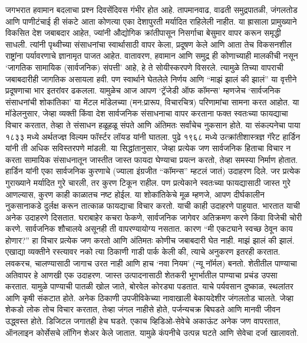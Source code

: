 जगभरात हवामान बदलाचा प्रश्न दिवसेंदिवस गंभीर होत आहे. तापमानवाढ, वाढती समुद्रपातळी, जंगलतोड आणि पाणीटंचाई ही संकटे आता कोणत्या एका देशापुरती मर्यादित राहिलेली नाहीत. या ह्रासाला प्रामुख्याने विकसित देश जबाबदार आहेत, ज्यांनी औद्योगिक क्रांतीपासून निसर्गाचा बेसुमार वापर करून समृद्धी साधली. त्यांनी पृथ्वीच्या संसाधनांचा स्वार्थासाठी वापर केला, प्रदूषण केले आणि आता तेच विकसनशील राष्ट्रांना पर्यावरणाचे ज्ञानामृत पाजत आहेत.
वातावरण, हवामान आणि समुद्र ही कोणाच्याही मालकीची नसून ‘जागतिक सामायिक (सार्वजनिक) संपत्ती’ आहे, हे ते सोयीस्करपणे विसरले. त्यामुळे तिच्या वापराची जबाबदारीही जागतिक असायला हवी. पण स्वार्थाने घेतलेले निर्णय आणि “माझं झालं की झालं” या वृत्तीने प्रदूषणाचा भार इतरांवर ढकलला. यामुळेच आज आपण ‘ट्रॅजेडी ऑफ कॉमन्स’ म्हणजेच ‘सार्वजनिक संसाधनांची शोकांतिका’ या मेंटल मॉडेलच्या (मन:प्रारूप, विचारचित्र) परिणामांचा सामना करत आहोत. या मॉडेलनुसार, जेव्हा व्यक्ती किंवा देश सार्वजनिक संसाधनाचा वापर करताना फक्त स्वतःच्या फायद्याचा विचार करतात, तेव्हा ते संसाधन हळूहळू संपते आणि अंतिमतः सर्वांचेच नुकसान होते.
या संकल्पनेचा पाया १८३३ मध्ये अर्थतज्ज्ञ विल्यम फॉर्स्टर लॉयड यांनी घातला. पुढे १९६८ मध्ये उत्क्रांतीशास्त्रज्ञ गॅरेट हार्डिन यांनी ती अधिक सविस्तरपणे मांडली. या सिद्धांतानुसार, जेव्हा प्रत्येक जण सार्वजनिक हिताचा विचार न करता सामायिक संसाधनातून जास्तीत जास्त फायदा घेण्याचा प्रयत्न करतो, तेव्हा समस्या निर्माण होतात. हार्डिन यांनी एका सार्वजनिक कुरणाचे (ज्याला इंग्रजीत “कॉमन्स” म्हटलं जातं) उदाहरण दिले. जर प्रत्येक गुराख्याने मर्यादित गुरे चारली, तर कुरण टिकून राहील. पण प्रत्येकाने स्वतःच्या फायद्यासाठी जास्त गुरे आणल्यास, कुरण काही काळातच नष्ट होईल. या शोकांतिकेचे मूळ म्हणजे, आपण दीर्घकालीन नुकसानाकडे दुर्लक्ष करून तात्काळ फायद्याचा विचार करतो. याची काही उदाहरणे पाहुयात. 
भारतात याची अनेक उदाहरणे दिसतात. घराबाहेर कचरा फेकणे, सार्वजनिक जागेवर अतिक्रमण करणे किंवा विजेची चोरी करणे. सार्वजनिक शौचालये असूनही ती वापरण्यायोग्य नसतात. कारण “मी एकट्याने स्वच्छ ठेवून काय होणार?” हा विचार प्रत्येक जण करतो आणि अंतिमतः कोणीच जबाबदारी घेत नाही. माझं झालं की झालं.
एखाद्या व्यक्तीने रस्त्यावर नको त्या ठिकाणी गाडी पार्क केली की, त्याचे अनुकरण इतरही करतात. लवकरच, चालण्यासाठी जागाच उरत नाही आणि हाच ‘नवा नियम’ (न्यू नॉर्मल) बनतो.
शेतीतील पाण्याचा अतिवापर हे आणखी एक उदाहरण. जास्त उत्पादनासाठी शेतकरी भूगर्भातील पाण्याचा प्रचंड उपसा करतात. यामुळे पाण्याची पातळी खोल जाते, बोरवेल कोरड्या पडतात. याचे पर्यवसान दुष्काळ, स्थलांतर आणि कृषी संकटात होते.
अनेक ठिकाणी उपजीविकेच्या नावाखाली बेकायदेशीर जंगलतोड चालते. जेव्हा शेकडो लोक तोच विचार करतात, तेव्हा जंगल नाहीसे होते, पर्जन्यचक्र बिघडते आणि मानवी जीवन उद्ध्वस्त होते.
डिजिटल जगातही हेच घडते. एकाच व्हिडिओ-सेवेचे अकाऊंट अनेक जण वापरतात, ऑनलाइन कोर्सेसचे लॉगिन शेअर केले जातात. यामुळे कंपनीचे उत्पन्न घटते आणि सेवेचा दर्जा खालावतो.
